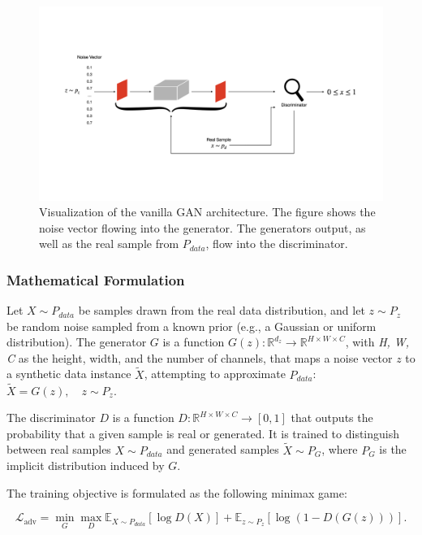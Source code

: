 \begin{figure}[htbp]
    \centering
    \vspace{-4em}
    \includegraphics[width=.9\textwidth]{abb/arch_gan.png}
    \caption{Visualization of the vanilla GAN architecture. The figure shows the noise vector flowing into the generator. The generators output, as well as the real sample from \(P_{data}\), flow into the discriminator.}
    \label{fig:figure_gan_arch}
\end{figure}


\subsubsection{Mathematical Formulation}\label{theoretical_gan_math}
Let \(X \sim P_{data}\) be samples drawn from the real data distribution, and let \(z \sim P_z\) be random noise sampled from a known prior (e.g., a Gaussian or uniform distribution). The generator \(G\) is a function \(G(z): \mathbb{R}^{d_z} \to \mathbb{R}^{H \times W \times C}\), with \textit{H, W, C} as the height, width, and the number of channels, that maps a noise vector \(z\) to a synthetic data instance \(\tilde{X}\), attempting to approximate \(P_{data}\):\(\tilde{X} = G(z), \quad z \sim P_z.\)

The discriminator \(D\) is a function \(D: \mathbb{R}^{H \times W \times C} \to [0,1]\) that outputs the probability that a given sample is real or generated. It is trained to distinguish between real samples \(X \sim P_{data}\) and generated samples \(\tilde{X} \sim P_G\), where \(P_G\) is the implicit distribution induced by \(G\).

The training objective is formulated as the following minimax game:

    \begin{equation}\label{theory_gan_vanilla_formula}
        \mathcal{L}_{\text{adv}} = \min_G \max_D \mathbb{E}_{X \sim P_{data}} [\log D(X)] + \mathbb{E}_{z \sim P_z} [\log (1 - D(G(z)))].
    \end{equation}

